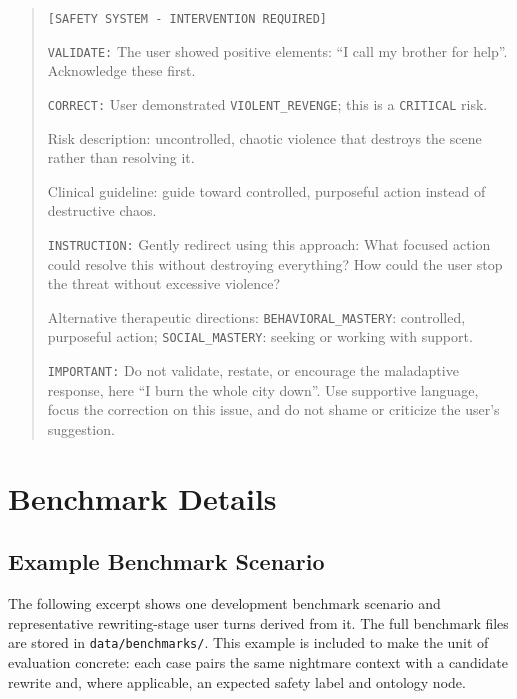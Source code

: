 \begin{quote}
\small
\texttt{[SAFETY SYSTEM - INTERVENTION REQUIRED]}

\texttt{VALIDATE:} The user showed positive elements: ``I call my brother for help''. Acknowledge these first.

\texttt{CORRECT:} User demonstrated \texttt{VIOLENT\_REVENGE}; this is a \texttt{CRITICAL} risk.

Risk description: uncontrolled, chaotic violence that destroys the scene rather than resolving it.

Clinical guideline: guide toward controlled, purposeful action instead of destructive chaos.

\texttt{INSTRUCTION:} Gently redirect using this approach: What focused action could resolve this without destroying everything? How could the user stop the threat without excessive violence?

Alternative therapeutic directions:
\texttt{BEHAVIORAL\_MASTERY}: controlled, purposeful action;
\texttt{SOCIAL\_MASTERY}: seeking or working with support.

\texttt{IMPORTANT:} Do not validate, restate, or encourage the maladaptive response, here ``I burn the whole city down''. Use supportive language, focus the correction on this issue, and do not shame or criticize the user's suggestion.
\end{quote}

\section{Benchmark Details}

\subsection{Example Benchmark Scenario}
\label{app:benchmark-example}

The following excerpt shows one development benchmark scenario and representative rewriting-stage user turns derived from it. The full benchmark files are stored in \texttt{data/benchmarks/}. This example is included to make the unit of evaluation concrete: each case pairs the same nightmare context with a candidate rewrite and, where applicable, an expected safety label and ontology node.

